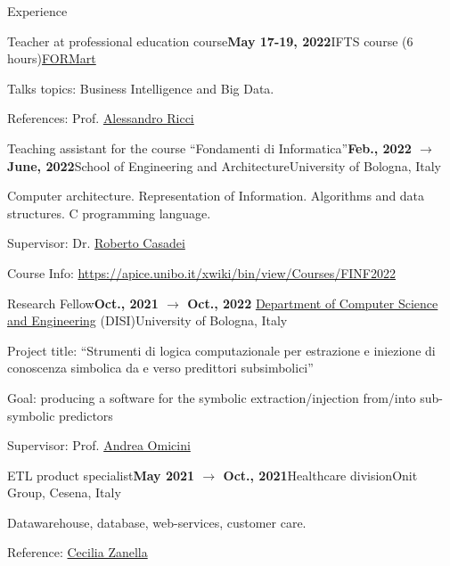 \documentclass{resume} %
\begin{document}
\begin{rSection}{Experience}
        \begin{rSubsection}{Teacher at professional education course}{\textbf{May 17-19, 2022}}{IFTS course (6 hours)}{\href{http://www.formart.it/home}{FORMart}}
            \item Talks topics: Business Intelligence and Big Data.
            \item References:  Prof. \href{mailto:a.ricci@unibo.it}{Alessandro Ricci}
        \end{rSubsection}
        
        \begin{rSubsection}{Teaching assistant for the course ``Fondamenti di Informatica''}{\textbf{Feb., 2022 $\rightarrow$ June, 2022}}{School of Engineering and Architecture}{University of Bologna, Italy}
            \item Computer architecture. Representation of Information. Algorithms and data structures. C programming language.
            \item Supervisor: Dr. \href{mailto:roberto.casadei@unibo.it}{Roberto Casadei}
            \item Course Info: \url{https://apice.unibo.it/xwiki/bin/view/Courses/FINF2022}
        \end{rSubsection}
        
        \begin{rSubsection}{Research Fellow}{\textbf{Oct., 2021 $\rightarrow$ Oct., 2022}}{ \href{https://disi.unibo.it/it}{Department of Computer Science and Engineering} (DISI)}{University of Bologna, Italy}
            \item Project title: ``Strumenti di logica computazionale per estrazione e iniezione di conoscenza simbolica da e verso predittori subsimbolici''
            \item Goal: producing a software for the symbolic extraction/injection from/into sub-symbolic predictors
            \item Supervisor: Prof. \href{mailto:andrea.omicini@unibo.it}{Andrea Omicini}
        \end{rSubsection}
        
        \begin{rSubsection}{ETL product specialist}{\textbf{May 2021 $\rightarrow$ Oct., 2021}}{Healthcare division}{Onit Group, Cesena, Italy}
            \item Datawarehouse, database, web-services, customer care.
            \item Reference: \href{mailto:czanella@onit.it}{Cecilia Zanella}
        \end{rSubsection}
        

\end{rSection}
\end{document}
